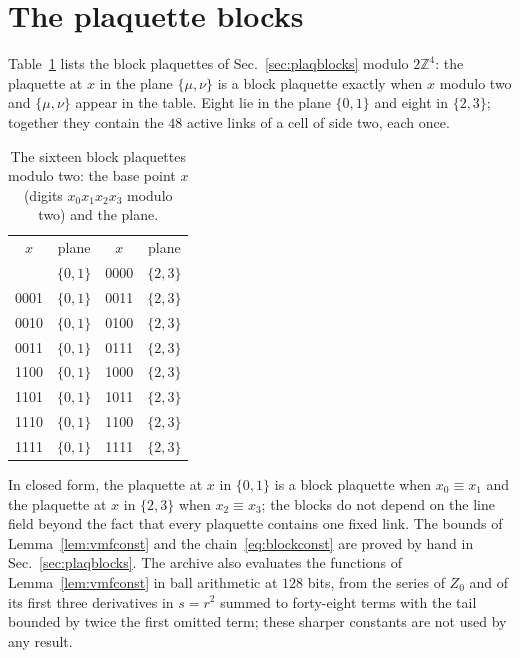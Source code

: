 \documentclass[aps,prd,twocolumn,superscriptaddress,nofootinbib,longbibliography,floatfix,amsmath,amssymb,10pt]{revtex4-2}
\theoremstyle{definition}
\theoremstyle{remark}
\newcommand{\Z}{\mathbb{Z}}
\begin{document}
\section{The plaquette blocks}\label{app:plaqblocks}

Table~\ref{tab:plaqblocks} lists the block plaquettes of
Sec.~\ref{sec:plaqblocks} modulo $2\Z^4$: the plaquette at $x$ in the plane
$\{\mu,\nu\}$ is a block plaquette exactly when $x$ modulo two and
$\{\mu,\nu\}$ appear in the table. Eight lie in the plane $\{0,1\}$ and eight
in $\{2,3\}$; together they contain the $48$ active links of a cell of side
two, each once.

\begin{table}[h]
\caption{The sixteen block plaquettes modulo two: the base point $x$
(digits $x_0x_1x_2x_3$ modulo two) and the plane.}
\label{tab:plaqblocks}
\begin{ruledtabular}
\begin{tabular}{cc|cc}
$x$&plane&$x$&plane\\
\colrule
0000&$\{0,1\}$&0000&$\{2,3\}$\\
0001&$\{0,1\}$&0011&$\{2,3\}$\\
0010&$\{0,1\}$&0100&$\{2,3\}$\\
0011&$\{0,1\}$&0111&$\{2,3\}$\\
1100&$\{0,1\}$&1000&$\{2,3\}$\\
1101&$\{0,1\}$&1011&$\{2,3\}$\\
1110&$\{0,1\}$&1100&$\{2,3\}$\\
1111&$\{0,1\}$&1111&$\{2,3\}$\\
\end{tabular}
\end{ruledtabular}
\end{table}

In closed form, the plaquette at $x$ in $\{0,1\}$ is a block plaquette when
$x_0\equiv x_1$ and the plaquette at $x$ in $\{2,3\}$ when $x_2\equiv x_3$; the
blocks do not depend on the line field beyond the fact that every plaquette
contains one fixed link. The bounds of Lemma~\ref{lem:vmfconst} and the
chain~\eqref{eq:blockconst} are proved by hand in Sec.~\ref{sec:plaqblocks}.
The archive also evaluates the functions of Lemma~\ref{lem:vmfconst} in
ball arithmetic at $128$ bits, from the series of $Z_0$ and of its first
three derivatives in $s=r^2$ summed to forty-eight terms with the tail
bounded by twice the first omitted term; these sharper constants are not
used by any result.
\end{document}
